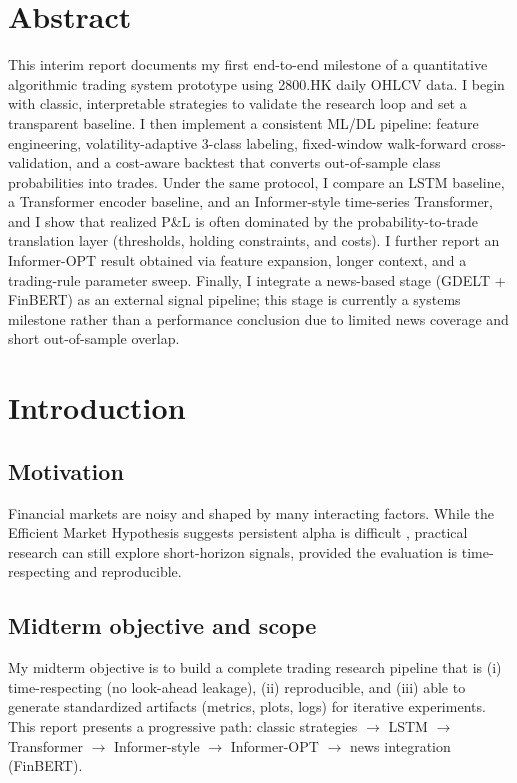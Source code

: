 \documentclass[12pt,a4paper,oneside]{report}
\begin{document}
\chapter*{Abstract}
This interim report documents my first end-to-end milestone of a quantitative algorithmic trading system prototype using 2800.HK daily OHLCV data. I begin with classic, interpretable strategies to validate the research loop and set a transparent baseline. I then implement a consistent ML/DL pipeline: feature engineering, volatility-adaptive 3-class labeling, fixed-window walk-forward cross-validation, and a cost-aware backtest that converts out-of-sample class probabilities into trades. Under the same protocol, I compare an LSTM baseline, a Transformer encoder baseline, and an Informer-style time-series Transformer, and I show that realized P\&L is often dominated by the probability-to-trade translation layer (thresholds, holding constraints, and costs). I further report an Informer-OPT result obtained via feature expansion, longer context, and a trading-rule parameter sweep. Finally, I integrate a news-based stage (GDELT + FinBERT) as an external signal pipeline; this stage is currently a systems milestone rather than a performance conclusion due to limited news coverage and short out-of-sample overlap.

\clearpage

\tableofcontents
\clearpage
\listoftables
\clearpage
\listoffigures
\clearpage

\chapter{Introduction}
\section{Motivation}
Financial markets are noisy and shaped by many interacting factors. While the Efficient Market Hypothesis suggests persistent alpha is difficult \citep{fama1970}, practical research can still explore short-horizon signals, provided the evaluation is time-respecting and reproducible.

\section{Midterm objective and scope}
My midterm objective is to build a complete trading research pipeline that is (i) time-respecting (no look-ahead leakage), (ii) reproducible, and (iii) able to generate standardized artifacts (metrics, plots, logs) for iterative experiments. This report presents a progressive path: classic strategies $\rightarrow$ LSTM $\rightarrow$ Transformer $\rightarrow$ Informer-style $\rightarrow$ Informer-OPT $\rightarrow$ news integration (FinBERT).
\end{document}
